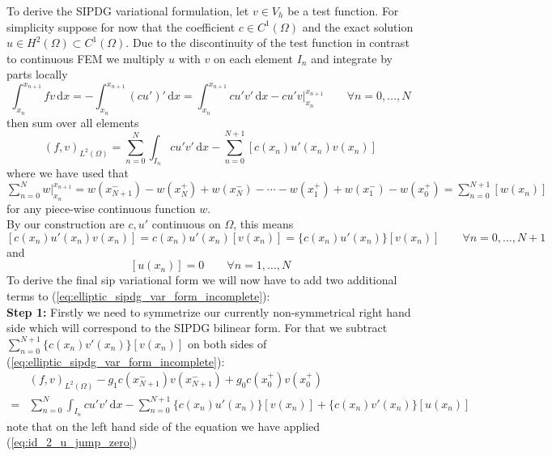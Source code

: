 To derive the SIPDG variational formulation, let $v \in V_h$ be a test
function. For simplicity suppose for now that the coefficient $c \in C^1(\Omega)$ and
the exact solution $u \in H^2(\Omega) \subset C^1(\Omega)$. 
Due to the discontinuity of the test function in contrast to 
continuous FEM we multiply $u$ with $v$ on each element $I_n$
and integrate by parts locally
\begin{equation*}
    \int_{x_n}^{x_{n+1}} fv\, \text{d}x = -\int_{x_n}^{x_{n+1}} (cu')'\, \text{d}x 
    = \int_{x_n}^{x_{n+1}} cu'v'\, \text{d}x 
    - \left. cu'v\right|_{x_n}^{x_{n+1}} \qquad \forall n=0,\ldots,N
\end{equation*}
then sum over all elements
\begin{equation}
    \label{eq:elliptic_sipdg_var_form_incomplete}
    (f,v)_{L^2(\Omega)} = \sum_{n=0}^N \int_{I_n} cu'v'\, \text{d}x 
    -\sum_{n=0}^{N+1} [c(x_n)u'(x_n)v(x_n)]
\end{equation}
where we have used that $\sum_{n=0}^N \left. w \right|_{x_n}^{x_{n+1}} = w(x_{N+1}^-) - 
w(x_{N}^+) + w(x_{N}^-) - \cdots - w(x_1^+) + w(x_1^-) - w(x_0^+) = \sum_{n=0}^{N+1} [w(x_n)]$ for any piece-wise continuous function $w$.
\\
By our construction are $c, u'$ continuous on $\Omega$, this means 
\begin{equation}
    \label{eq:id_1_cu_jump_zero}
        [c(x_n)u'(x_n)v(x_n)] = c(x_n)u'(x_n)[v(x_n)] = \{c(x_n)u'(x_n)\}[v(x_n)] \qquad \forall n=0,\ldots,N+1
\end{equation}
and 
\begin{equation}
    \label{eq:id_2_u_jump_zero}
    [u(x_n)] = 0 \qquad \forall n=1,\ldots,N
\end{equation}
To derive the final sip variational form we will now have to add two additional terms
to (\ref{eq:elliptic_sipdg_var_form_incomplete}): \\
\textbf{Step 1:} Firstly we need to symmetrize our currently non-symmetrical right hand side
which will correspond to the SIPDG bilinear form.
For that we subtract $\sum_{n=0}^{N+1} \{c(x_n)v'(x_n)\}[v(x_n)]$ on both sides of
(\ref{eq:elliptic_sipdg_var_form_incomplete}):
\begin{align*}
    &(f,v)_{L^2(\Omega)}-g_1c(x_{N+1}^-)v(x_{N+1}^-) + g_0c(x_0^+)v(x_0^+) \\
    = &\sum_{n=0}^N \int_{I_n} cu'v'\, \text{d}x 
    -\sum_{n=0}^{N+1} \{c(x_n)u'(x_n)\}[v(x_n)] + \{c(x_n)v'(x_n)\}[u(x_n)]
\end{align*}
note that on the left hand side of the equation we have applied (\ref{eq:id_2_u_jump_zero})
